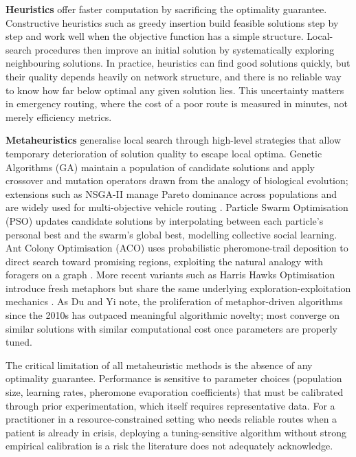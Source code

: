 \documentclass[paper=A4, 12pt, mathscr]{report}
\begin{document}
	\textbf{Heuristics} offer faster computation by sacrificing the optimality
	guarantee. Constructive heuristics such as greedy insertion build feasible
	solutions step by step and work well when the objective function has a simple
	structure. Local-search procedures then improve an initial solution by
	systematically exploring neighbouring solutions. In practice, heuristics
	can find good solutions quickly, but their quality depends heavily on
	network structure, and there is no reliable way to know how far below
	optimal any given solution lies. This uncertainty matters in emergency
	routing, where the cost of a poor route is measured in minutes, not merely
	efficiency metrics.
	
	\textbf{Metaheuristics} generalise local search through high-level strategies
	that allow temporary deterioration of solution quality to escape local optima.
	Genetic Algorithms (GA) maintain a population of candidate solutions and
	apply crossover and mutation operators drawn from the analogy of biological
	evolution; extensions such as NSGA-II manage Pareto dominance across
	populations and are widely used for multi-objective vehicle routing
	\cite{tirkolaee2020}. Particle Swarm Optimisation (PSO) updates candidate
	solutions by interpolating between each particle's personal best and the
	swarm's global best, modelling collective social learning. Ant Colony
	Optimisation (ACO) uses probabilistic pheromone-trail deposition to direct
	search toward promising regions, exploiting the natural analogy with foragers
	on a graph \cite{ding2021}. More recent variants such as Harris Hawks
	Optimisation introduce fresh metaphors but share the same underlying
	exploration-exploitation mechanics \cite{hussein2023}. As Du and Yi
	\cite{du} note, the proliferation of metaphor-driven algorithms since the
	2010s has outpaced meaningful algorithmic novelty; most converge on similar
	solutions with similar computational cost once parameters are properly tuned.
	
	The critical limitation of all metaheuristic methods is the absence of any
	optimality guarantee. Performance is sensitive to parameter choices
	(population size, learning rates, pheromone evaporation coefficients) that
	must be calibrated through prior experimentation, which itself requires
	representative data. For a practitioner in a resource-constrained setting
	who needs reliable routes when a patient is already in crisis, deploying a
	tuning-sensitive algorithm without strong empirical calibration is a risk
	the literature does not adequately acknowledge.
	
\end{document}
